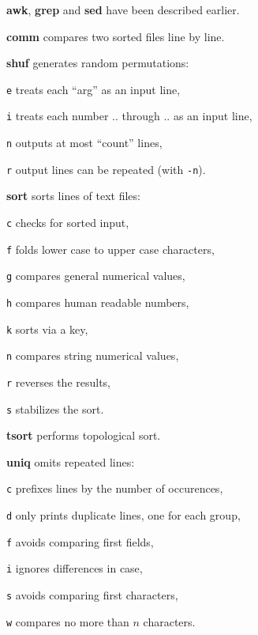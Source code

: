 \renewcommand\theFancyVerbLine{\normalsize\arabic{FancyVerbLine}}

\begin{compactenum}
\item [\cmdvar] \textbf{awk}, \textbf{grep} and \textbf{sed} have been described earlier.
\end{compactenum}

\begin{compactenum}
	\item [\cmdcore] \textbf{comm} compares two sorted files line by line.
	\item [\cmdcore] \textbf{shuf} generates random permutations:
	\item [\texttt{e}] treats each ``arg'' as an input line,
	\item [\texttt{i}] treats each number .. through .. as an input line, 
	\item [\texttt{n}] outputs at most ``count'' lines,
	\item [\texttt{r}] output lines can be repeated (with \texttt{-n}).
	\item [\cmdcore] \textbf{sort} sorts lines of text files:
	\item [\texttt{c}] checks for sorted input,
	\item [\texttt{f}] folds lower case to upper case characters,
	\item [\texttt{g}] compares general numerical values,
	\item [\texttt{h}] compares human readable numbers,
	\item [\texttt{k}] sorts via a key,
	\item [\texttt{n}] compares string numerical values,
	\item [\texttt{r}] reverses the results,
	\item [\texttt{s}] stabilizes the sort.
	\item [\cmdcore] \textbf{tsort} performs topological sort.
	\item [\cmdcore] \textbf{uniq} omits repeated lines:
	\item [\texttt{c}] prefixes lines by the number of occurences,
	\item [\texttt{d}] only prints duplicate lines, one for each group,
	\item [\texttt{f}] avoids comparing first fields,
	\item [\texttt{i}] ignores differences in case,
	\item [\texttt{s}] avoids comparing first characters,
	\item [\texttt{w}] compares no more than $n$ characters.
\end{compactenum}

